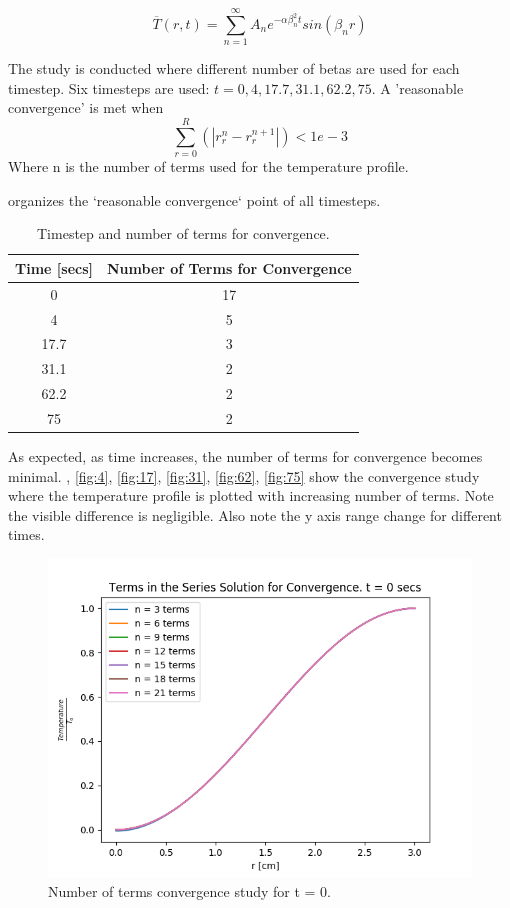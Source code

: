 \documentclass[12pt,letterpaper]{article}
\begin{document}
\[\overline{T}(r,t) = \sum_{n=1}^{\infty} A_n e^{-\alpha \beta_n^2 t} sin(\beta_n r)\]

The study is conducted where different number of betas are used for each timestep.
Six timesteps are used: $t = 0, 4, 17.7, 31.1, 62.2, 75$.
A 'reasonable convergence' is met when $$ \sum_{r=0}^{R} (|r_{r}^n - r_{r}^{n+1}|) < 1e-3$$
Where n is the number of terms used for the temperature profile.

 organizes the `reasonable convergence` point of all timesteps.

\begin{table}[h]
     \centering
    \begin{tabular}{cc}
       \hline
       \textbf{Time [secs]} & \textbf{Number of Terms for Convergence}  \\
       \hline
       0 & 17 \\
       4 & 5 \\
       17.7 & 3 \\
       31.1 & 2 \\
       62.2 & 2 \\
       75 & 2 \\
       \hline
    \end{tabular}
    \caption {Timestep and number of terms for convergence.}
    \label{tab:conv}
\end{table}


As expected, as time increases, the number of terms for convergence
becomes minimal. 
, \ref{fig:4}, \ref{fig:17}, \ref{fig:31}, \ref{fig:62}, \ref{fig:75} show the 
convergence study where the temperature profile is plotted with
increasing number of terms. Note the visible difference is negligible.
Also note the y axis range change for different times.


\begin{figure}[htbp!]
  \begin{center}
    \includegraphics[scale=0.7]{terms_0.png}
  \end{center}
  \caption{Number of terms convergence study for t = 0.}
  \label{fig:0}
\end{figure}
\end{document}
